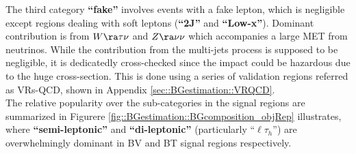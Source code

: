 The third category \textbf{``fake''} involves events with a fake lepton, which is negligible except regions dealing with soft leptons (\textbf{``2J''} and \textbf{``Low-x''}). Dominant contribution is from $W\ra\tau\nu$ and $Z\ra\nu\nu$ which accompanies a large MET from neutrinos. While the contribution from the multi-jets process is supposed to be negligible, it is dedicatedly cross-checked since the impact could be hazardous due to the huge cross-section. This is done using a series of validation regions referred as VRs-QCD, shown in Appendix \ref{sec::BGestimation::VRQCD}. \\

The relative popularity over the sub-categories in the signal regions are summarized in Figurere \ref{fig::BGestimation::BGcomposition_objRep} illustrates, where \textbf{``semi-leptonic''} and \textbf{``di-leptonic''} (particularly ``$\ell\tau_h$'') are overwhelmingly dominant in BV and BT signal regions respectively.


